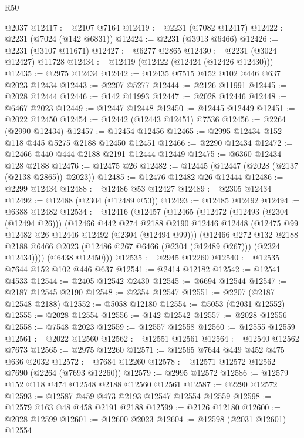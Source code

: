 \begin{lexlean}{R50}
\begin{coremodule}
    @2037
@12417 := @2107 @7164
@12419 := @2231 (@7082 @12417)
@12422 := @2231 (@7024 (@142 @6831))
@12424 := @2231 (@3913 @6466)
@12426 := @2231 (@3107 @11671)
@12427 := @6277 @2865
@12430 := @2231 (@3024 @12427) @11728
@12434 := @12419 (@12422 (@12424 (@12426 @12430)))
@12435 := @2975 @12434
@12442 := @12435 @7515 @152 @102 @446 @637 @2023 @12434
@12443 := @2207 @5277
@12444 := @2126 @11991
@12445 := @2028 @12444
@12446 := @142 @11993
@12447 := @2028 @12446
@12448 := @6467 @2023
@12449 := @12447 @12448
@12450 := @12445 @12449
@12451 := @2022 @12450
@12454 := @12442 (@12443 @12451) @7536
@12456 := @2264 (@2990 @12434)
@12457 := @12454 @12456
@12465 := @2995 @12434 @152 @118 @445 @5275 @2188 @12450 @12451
@12466 := @2290 @12434
@12472 := @12466 @440 @444 @2188 @2191 @12444 @12449
@12475 := @6360 @12434 @128 @2188
@12476 := @12475 @26
@12482 := @12445 (@12447 (@2028 (@2137 (@2138 @2865)) @2023))
@12485 := @12476 @12482 @26 @12444
@12486 := @2299 @12434
@12488 := @12486 @53 @12427
@12489 := @2305 @12434
@12492 := @12488 (@2304 (@12489 @53))
@12493 := @12485 @12492
@12494 := @6388 @12482
@12534 := @12416
    (@12457
      (@12465
        (@12472
          (@12493 (@2304 (@12494 @26)))
          (@12466
            @442
            @274
            @2188
            @2190
            @12446
            @12448
            (@12475 @99 @12482 @26 @12446 @12492 (@2304 (@12494 @99)))
            (@12466
              @272
              @132
              @2188
              @2188
              @6466
              @2023
              (@12486 @267 @6466 (@2304 (@12489 @267)))
              (@2324 @12434))))
        (@6438 @12450)))
@12535 := @2945 @12260
@12540 := @12535 @7644 @152 @102 @446 @637
@12541 := @2414 @12182
@12542 := @12541 @4533
@12544 := @2405 @12542 @2430
@12545 := @6694 @12544
@12547 := @2187 @12545 @2190
@12548 := @2354 @12547
@12551 := @2207 (@2187 @12548 @2188)
@12552 := @5058 @12180
@12554 := @5053 (@2031 @12552)
@12555 := @2028 @12554
@12556 := @142 @12542
@12557 := @2028 @12556
@12558 := @7548 @2023
@12559 := @12557 @12558
@12560 := @12555 @12559
@12561 := @2022 @12560
@12562 := @12551 @12561
@12564 := @12540 @12562 @7673
@12565 := @2975 @12260
@12571 := @12565 @7644 @449 @452 @475 @636 @2032
@12572 := @7684 @12260
@12578 := @12571 @12572 @12562 @7690 (@2264 (@7693 @12260))
@12579 := @2995 @12572
@12586 := @12579 @152 @118 @474 @12548 @2188 @12560 @12561
@12587 := @2290 @12572
@12593 := @12587 @459 @473 @2193 @12547 @12554 @12559
@12598 := @12579 @163 @48 @458 @2191 @2188
@12599 := @2126 @12180
@12600 := @2028 @12599
@12601 := @12600 @2023
@12604 := @12598 (@2031 @12601) @12554

\end{coremodule}
\end{lexlean}
